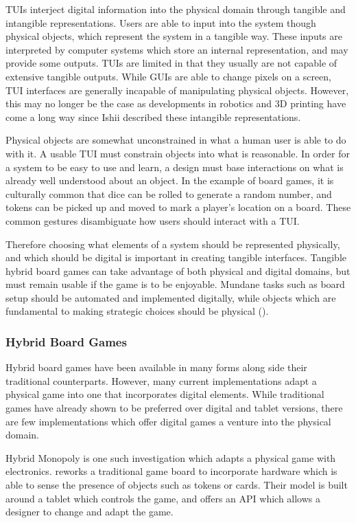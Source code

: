 \documentclass[12pt]{article}
\begin{document}
TUIs interject digital information into the physical domain through tangible and intangible representations. 
Users are able to input into the system though physical objects, which represent the system in a tangible way.
These inputs are interpreted by computer systems which store an internal representation, and may provide some outputs. 
TUIs are limited in that they usually are not capable of extensive tangible outputs. 
While GUIs are able to change pixels on a screen, TUI interfaces are generally incapable of manipulating physical objects. 
However, this may no longer be the case as developments in robotics and 3D printing have come a long way since Ishii described these intangible representations. 

Physical objects are somewhat unconstrained in what a human user is able to do with it.
A usable TUI must constrain objects into what is reasonable. 
In order for a system to be easy to use and learn, a design must base interactions on what is already well understood about an object. 
In the example of board games, it is culturally common that dice can be rolled to generate a random number, and tokens can be picked up and moved to mark a player's location on a board. 
These common gestures disambiguate how users should interact with a TUI. 

Therefore choosing what elements of a system should be represented physically, and which should be digital is important in creating tangible interfaces. 
Tangible hybrid board games can take advantage of both physical and digital domains, but must remain usable if the game is to be enjoyable. 
Mundane tasks such as board setup should be automated and implemented digitally, while objects which are fundamental to making strategic choices should be physical (\cite{ip2011virtualize}).

\subsubsection{Hybrid Board Games}
Hybrid board games have been available in many forms along side their traditional counterparts. 
However, many current implementations adapt a physical game into one that incorporates digital elements. 
While traditional games have already shown to be preferred over digital and tablet versions, there are few implementations which offer digital games a venture into the physical domain. 

Hybrid Monopoly is one such investigation which adapts a physical game with electronics. 
\textcite{park2017hybrid} reworks a traditional game board to incorporate hardware which is able to sense the presence of objects such as tokens or cards. 
Their model is built around a tablet which controls the game, and offers an API which allows a designer to change and adapt the game.
\end{document}
